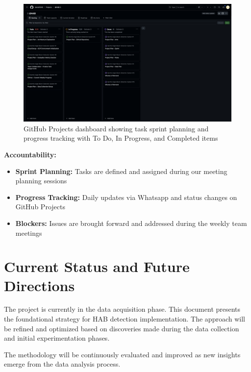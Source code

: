 \documentclass[12pt]{article}
\begin{document}
\begin{figure}[H]
\centering
\includegraphics[width=\linewidth]{GithubProject.png}
\captionsetup{width=.8\linewidth} 
\caption[GitHub Projects Board]{GitHub Projects dashboard showing task sprint planning and progress tracking with To Do, In Progress, and Completed items}
\label{fig:github-project}
\end{figure}

\textbf{Accountability:}
\begin{itemize}
    \item \textbf{Sprint Planning:} Tasks are defined and assigned during our meeting planning sessions
    \item \textbf{Progress Tracking:} Daily updates via Whatsapp and status changes on GitHub Projects
    \item \textbf{Blockers:} Issues are brought forward and addressed during the weekly team meetings
\end{itemize}

\section{Current Status and Future Directions}

The project is currently in the data acquisition phase. This document presents the foundational strategy for HAB detection implementation. The approach will be refined and optimized based on discoveries made during the data collection and initial experimentation phases.

The methodology will be continuously evaluated and improved as new insights emerge from the data analysis process.






 
\end{document}
